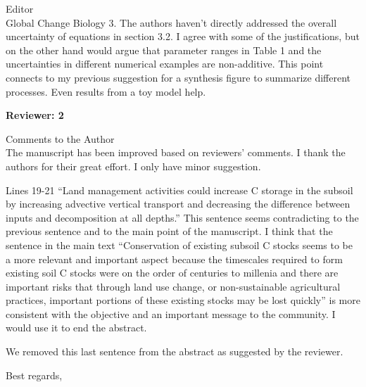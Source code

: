 \documentclass[11pt]{bgcletter}
\newcommand{\answer}[1] {
{\color{cyan} #1}
}
\begin{document}
\begin{letter}{Editor\\
   Global Change Biology
}
3. The authors haven't directly addressed the overall uncertainty of equations in section 3.2. I agree with some of the justifications, but on the other hand would argue that parameter ranges in Table 1 and the uncertainties in different numerical examples are non-additive. This point connects to my previous suggestion for a synthesis figure to summarize different processes. Even results from a toy model help.
\newpage

\textbf{Reviewer: 2}

Comments to the Author \\
The manuscript has been improved based on reviewers’ comments. I thank the authors for their great effort. I only have minor suggestion.

Lines 19-21 “Land management activities could increase C storage in the subsoil by increasing advective vertical transport and decreasing the difference between inputs and decomposition at all depths.” This sentence seems contradicting to the previous sentence and to the main point of the manuscript. I think that the sentence in the main text “Conservation of existing subsoil C stocks seems to be a more relevant and important aspect because the timescales required to form existing soil C stocks were on the order of centuries to millenia and there are important risks that through land use change, or non-sustainable agricultural practices, important portions of these existing stocks may be lost quickly” is more consistent with the objective and an important message to the community. I would use it to end the abstract.

\answer{We removed this last sentence from the abstract as suggested by the reviewer.}

 \closing{Best regards,} 
 \end{letter}

 
\end{document}
